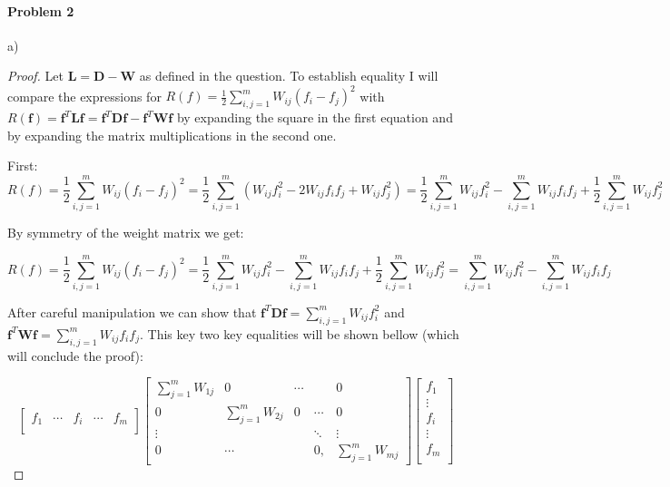 \documentclass[12pt]{report}
\begin{document}
\paragraph{Problem 2}
a)


\begin{proof} Let $\mathbf{L} = \mathbf{D} - \mathbf{W}$ as defined in the question. 
To establish equality I will compare the expressions for $R(f) = \frac{1}{2}\sum^m_{i,j=1} W_{ij}(f_i - f_j)^2$ with $R(\mathbf{f}) = \mathbf{f}^T\mathbf{L}\mathbf{f} = \mathbf{f}^T\mathbf{D}\mathbf{f} - \mathbf{f}^T\mathbf{W}\mathbf{f} $ by expanding the square in the first equation and by expanding the matrix multiplications in the second one.

First:
 $$R(f) = \frac{1}{2}\sum^m_{i,j=1} W_{ij}(f_i - f_j)^2 = \frac{1}{2}\sum^m_{i,j=1} (W_{ij}f_i^2 -2W_{ij}f_if_j + W_{ij}f_j^2) = \frac{1}{2}\sum^m_{i,j=1} W_{ij}f_i^2 -\sum^m_{i,j=1}W_{ij}f_if_j + \frac{1}{2}\sum^m_{i,j=1}W_{ij}f_j^2 $$
 
 By symmetry of the weight matrix we get:
 
 $$R(f) = \frac{1}{2}\sum^m_{i,j=1} W_{ij}(f_i - f_j)^2 = \frac{1}{2}\sum^m_{i,j=1} W_{ij}f_i^2 -\sum^m_{i,j=1}W_{ij}f_if_j + \frac{1}{2}\sum^m_{i,j=1}W_{ij}f_j^2 = \sum^m_{i,j=1} W_{ij}f_i^2 -\sum^m_{i,j=1}W_{ij}f_if_j  $$
  
After careful manipulation we can show that 
$\mathbf{f}^T\mathbf{D}\mathbf{f} =  \sum^m_{i,j=1} W_{ij}f_i^2 $ 
and 
$\mathbf{f}^T\mathbf{W}\mathbf{f} = \sum^m_{i,j=1}W_{ij}f_if_j $. This key two key equalities will be shown bellow (which will conclude the proof):
  
$$
\begin{bmatrix}
f_1& \cdots & f_i & \cdots & f_m\\
\end{bmatrix} 
\begin{bmatrix}
\sum_{j=1}^{m}W_{1j} & 0 & \cdots &  & 0 \\
0 & \sum_{j=1}^{m}W_{2j} & 0 & \cdots  & 0 \\
\vdots &   &  &  \ddots  & \vdots \\
0 & \cdots &  & 0, & \sum_{j=1}^{m}W_{mj}
\end{bmatrix} 
\begin{bmatrix}
f_1\\ 
\vdots \\
f_i \\
\vdots \\
f_m\\
\end{bmatrix}
$$


\end{proof}
\end{document}
